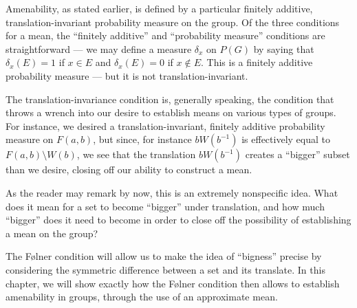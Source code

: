 Amenability, as stated earlier, is defined by a particular finitely additive, translation-invariant probability measure on the group. Of the three conditions for a mean, the ``finitely additive'' and ``probability measure'' conditions are straightforward --- we may define a measure $\delta_x$ on $P(G)$ by saying that $\delta_x(E) = 1$ if $x\in E$ and $\delta_x(E) = 0$ if $x\notin E$. This is a finitely additive probability measure --- but it is not translation-invariant.\newline

The translation-invariance condition is, generally speaking, the condition that throws a wrench into our desire to establish means on various types of groups. For instance, we desired a translation-invariant, finitely additive probability measure on $F(a,b)$, but since, for instance $bW\left( b^{-1} \right)$ is effectively equal to $F(a,b)\setminus W(b)$, we see that the translation $bW\left( b^{-1} \right)$ creates a ``bigger'' subset than we desire, closing off our ability to construct a mean.\newline

As the reader may remark by now, this is an extremely nonspecific idea. What does it mean for a set to become ``bigger'' under translation, and how much ``bigger'' does it need to become in order to close off the possibility of establishing a mean on the group?\newline

The Følner condition will allow us to make the idea of ``bigness'' precise by considering the symmetric difference between a set and its translate. In this chapter, we will show exactly how the Følner condition then allows to establish amenability in groups, through the use of an approximate mean.
